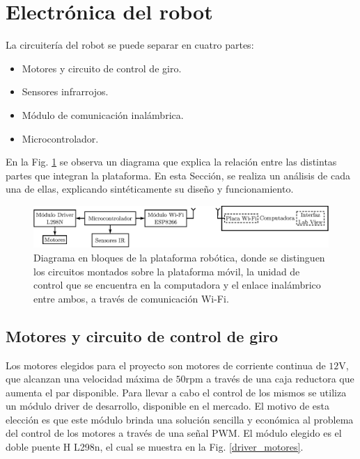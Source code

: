 \documentclass[conference,a4paper,9pt]{IEEEtran}
\begin{document}
\section{Electrónica del robot}

La circuitería del robot se puede separar en cuatro partes:

\begin{itemize}
	\item Motores y circuito de control de giro.
	\item Sensores infrarrojos.
	\item Módulo de comunicación inalámbrica.
	\item Microcontrolador.
\end{itemize}

En la Fig. \ref{diagrama_bloques} se observa un diagrama que explica la relación entre las distintas partes que integran la plataforma. En esta Sección, se realiza un análisis de cada una de ellas, explicando sintéticamente su diseño y funcionamiento.

\begin{figure}%
\centering\includegraphics[scale=1]{diagrama_bloques.eps}%
\caption{Diagrama en bloques de la plataforma robótica, donde se distinguen los circuitos montados sobre la plataforma móvil, la unidad de control que se encuentra en la computadora y el enlace inalámbrico entre ambos, a través de comunicación Wi-Fi.}%
\label{diagrama_bloques}%
\end{figure}

\subsection{Motores y circuito de control de giro}

Los motores elegidos para el proyecto son motores de corriente continua de $12\mathrm{V}$, que alcanzan una velocidad máxima de $50\mathrm{rpm}$ a través de una caja reductora que aumenta el par disponible. Para llevar a cabo el control de los mismos se utiliza un módulo driver de desarrollo, disponible en el mercado. El motivo de esta elección es que este módulo brinda una solución sencilla y económica al problema del control de los motores a través de una señal PWM. El módulo elegido es el doble puente H L298n, el cual se muestra en la Fig. \ref{driver_motores}.
\end{document}
